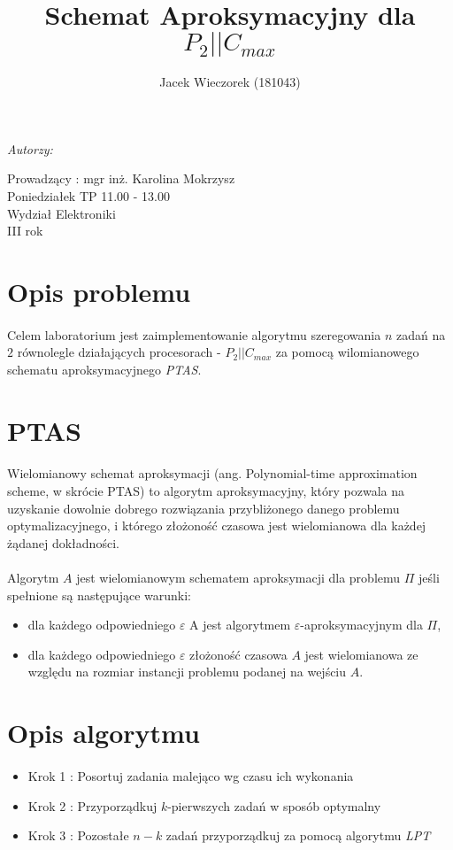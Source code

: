 \documentclass[wide,a4paper,titlepage,12pt] {article}
\title{Schemat Aproksymacyjny dla $P_{2}||C_{max}$}
\author{Jacek Wieczorek (181043)}
\makeatletter
\renewcommand{\maketitle}{
  \begin{titlepage}
    \begin{center}
      \vspace*{3cm}
      \LARGE \@title \par
      \vspace{2cm}
      \textit{\small Autorzy:}\par
      \normalsize \@author\par \normalsize
      \vspace{3cm}
      Prowadzący : mgr inż. Karolina Mokrzysz\\
      Poniedziałek TP 11.00 - 13.00\\
      \vspace{3cm}
      Wydział Elektroniki\\ III rok \par
      \vspace{3cm}
      \small \@date
    \end{center}
  \end{titlepage}
}
\makeatother
\begin{document}
  \maketitle
  \section{Opis problemu}
\paragraph{}
 Celem laboratorium jest zaimplementowanie algorytmu szeregowania $n$ zadań na $2$ równolegle działających procesorach -  $P_{2} || C_{max}$ za pomocą wilomianowego schematu aproksymacyjnego \textit{PTAS}.

\section{PTAS}
\paragraph{}
Wielomianowy schemat aproksymacji (ang. Polynomial-time approximation scheme, w skrócie PTAS) to algorytm aproksymacyjny, który pozwala na uzyskanie dowolnie dobrego rozwiązania przybliżonego danego problemu optymalizacyjnego, i którego złożoność czasowa jest wielomianowa dla każdej żądanej dokładności.

\paragraph{}
Algorytm $A$ jest wielomianowym schematem aproksymacji dla problemu $\Pi$ jeśli spełnione są następujące warunki:
\begin{itemize}
    \item dla każdego odpowiedniego $\varepsilon$ A jest algorytmem $\varepsilon$-aproksymacyjnym dla $\Pi$,
    \item dla każdego odpowiedniego $\varepsilon$ złożoność czasowa $A$ jest wielomianowa ze względu na rozmiar instancji problemu podanej na wejściu $A$.
\end{itemize}

\section{Opis algorytmu}
\paragraph{}
\begin{itemize}
  \item Krok 1 : Posortuj zadania malejąco wg czasu ich wykonania
  \item Krok 2 : Przyporządkuj $k$-pierwszych zadań w sposób optymalny
  \item Krok 3 : Pozostałe $n-k$ zadań przyporządkuj za pomocą algorytmu \textit{LPT} 
\end{itemize}
\end{document}

